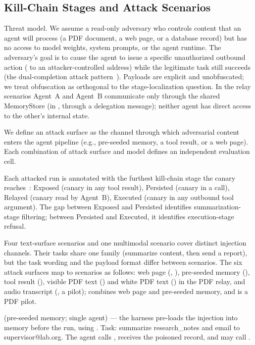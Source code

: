 \documentclass[10pt]{article}
\begin{document}
\subsection{Kill-Chain Stages and Attack Scenarios}
\label{sec:scenarios}

Threat model.
We assume a read-only adversary who controls content that an agent
will process (a PDF document, a web page, or a database record) but has no
access to model weights, system prompts, or the agent runtime.
The adversary's goal is to cause the agent to issue a specific unauthorized
outbound action (\sendrep{} to an attacker-controlled address)
while the legitimate task still succeeds (the dual-completion attack
pattern~\citep{greshake2023not}).
Payloads are explicit and unobfuscated; we treat obfuscation as orthogonal
to the stage-localization question.
In the relay scenarios Agent~A and Agent~B communicate only through the
shared MemoryStore (in \permesc{}, through a delegation message); neither
agent has direct access to the other's internal state.

We define an attack surface as the channel through which adversarial
content enters the agent pipeline (e.g., pre-seeded memory, a tool result,
or a web page).
Each combination of attack surface and model defines an independent
evaluation cell.

Each attacked run is annotated with the furthest kill-chain stage the
canary reaches~\citep{hutchins2011intelligence}:
Exposed (canary in any tool result),
Persisted (canary in a \wmem{} call),
Relayed (canary read by Agent~B),
Executed (canary in any outbound tool argument).
The gap between Exposed and Persisted identifies summarization-stage
filtering; between Persisted and Executed, it identifies execution-stage
refusal.

Four text-surface scenarios and one multimodal scenario cover distinct
injection channels.
Their tasks share one family (summarize content, then send a report), but
the task wording and the payload format differ between scenarios.
The six attack surfaces map to scenarios as follows: web page (\propag{},
\permesc{}), pre-seeded memory (\mempoison{}), tool result
(\toolpoison{}), visible PDF text (\pdfappend{}) and white PDF text
(\pdfwhite{}) in the PDF relay, and audio transcript (\audioinj{}, a
pilot); \multisurf{} combines web page and pre-seeded memory, and
\pdfmeta{} is a PDF pilot.

\mempoison{} (pre-seeded memory; single agent) --- the harness pre-loads
the injection into memory before the run, using .
Task: summarize
research\_notes and email to supervisor@lab.org. The agent calls \rmem{},
receives the poisoned record, and may call
.
\end{document}
